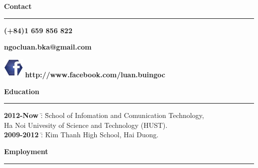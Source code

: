 \documentclass[a4paper,12pt]{article}
\begin{document}

\textbf{\Large Contact\\}
\makebox[0pt][1]{\large\bf }\ignorespaces%
{\rule[-1mm]{\linewidth}{0.5mm}}

\begin{minipage}{0.5\textwidth}
	\textbf{(+84)1 659 856 822}
	
\end{minipage}
\begin{minipage}{0.5\textwidth}
	\textbf{ngocluan.bka@gmail.com\\}
\end{minipage}
\begin{center}
\includegraphics[width=1cm]{2.jpg}
\textbf{http://www.facebook.com/luan.buingoc}

\end{center}


\textbf{{\Large Education\\}}
\makebox[0pt][1]{\large\bf }\ignorespaces%
{\rule[-1mm]{\linewidth}{0.5mm}}

\begin{tabbing}

\= \textbf{2012-Now} \= : \= School of Infomation and Comunication Technology, \\
\> 	  \>   \> Ha Noi Univesity of Science and Technology (HUST).\\
\= \textbf{2009-2012} \= : \= Kim Thanh High School, Hai Duong.\\
\end{tabbing}

\textbf{\Large Employment\\}
\makebox[0pt][1]{\large\bf }\ignorespaces%
{\rule[-1mm]{\linewidth}{.5mm}}
\end{document}

